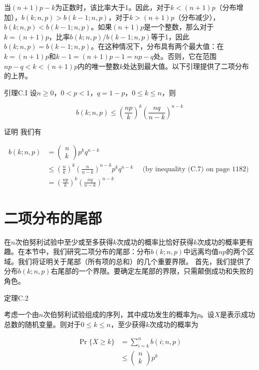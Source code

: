 \documentclass[lang=cn,newtx,10pt,scheme=chinese]{elegantbook}
\begin{document}
当$(n+1)p-k$为正数时，该比率大于1。因此，对于$k<(n+1)p$（分布增加），$b(k;n,p)>b(k-1;n,p)$，对于$k>(n+1)p$（分布减少），$b(k;n,p)<b(k-1;n,p)$。如果$(n+1)p$是一个整数，那么对于$k=(n+1)p$，比率$b(k;n,p)/b(k-1;n,p)$等于1，因此$b(k;n,p)=b(k-1;n,p)$。在这种情况下，分布具有两个最大值：在$k=(n+1)p$和$k-1=(n+1)p-1=n p-q$处。否则，它在范围$n p-q<k<(n+1)p$内的唯一整数$k$处达到最大值。以下引理提供了二项分布的上界。

引理C.I
设$n \geq 0$，$0<p<1$，$q=1-p$，$0 \leq k \leq n$，则

$$
b(k ; n, p) \leq\left(\frac{n p}{k}\right)^k\left(\frac{n q}{n-k}\right)^{n-k}
$$

证明 我们有

$$
\begin{aligned}
b(k ; n, p) & =\left(\begin{array}{l}
n \\
k
\end{array}\right) p^k q^{n-k} \\
& \leq\left(\frac{n}{k}\right)^k\left(\frac{n}{n-k}\right)^{n-k} p^k q^{n-k} \quad \text { (by inequality (C.7) on page 1182) } \\
& =\left(\frac{n p}{k}\right)^k\left(\frac{n q}{n-k}\right)^{n-k}
\end{aligned}
$$

\section{二项分布的尾部}

在$n$次伯努利试验中至少或至多获得$k$次成功的概率比恰好获得$k$次成功的概率更有趣。在本节中，我们研究二项分布的尾部：分布$b(k;n,p)$中远离均值$np$的两个区域。我们将证明关于尾部（所有项的总和）的几个重要界限。
首先，我们提供了分布$b(k;n,p)$右尾部的一个界限。要确定左尾部的界限，只需颠倒成功和失败的角色。

定理C.2

考虑一个由$n$次伯努利试验组成的序列，其中成功发生的概率为$p$。设$X$是表示成功总数的随机变量。则对于$0 \leq k \leq n$，至少获得$k$次成功的概率为

$$
\begin{aligned}
\operatorname{Pr}\{X \geq k\} & =\sum_{i=k}^n b(i ; n, p) \\
& \leq\left(\begin{array}{l}
n \\
k
\end{array}\right) p^k
\end{aligned}
$$
\end{document}
